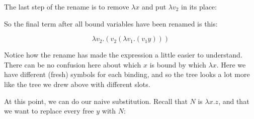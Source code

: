 \documentclass{book}
\numberwithin{equation}{chapter}
\begin{document}
\noindent
The last step of the rename is to remove $\lambda x$ and put $\lambda v_{2}$ in its place:

\begin{center}
\end{center}

\noindent
So the final term after all bound variables have been renamed is this:

\begin{equation}
\lambda v_{2}.(v_{2} (\lambda v_{1}.(v_{1} y)))
\end{equation}

\noindent
Notice how the rename has made the expression a little easier to understand. There can be no confusion here about which $x$ is bound by which $\lambda x$. Here we have different (fresh) symbols for each binding, and so the tree looks a lot more like the tree we drew above with different slots.

At this point, we can do our naive substitution. Recall that $N$ is $\lambda x.z$, and that we want to replace every free $y$ with $N$:

\begin{center}
\end{center}
\end{document}
